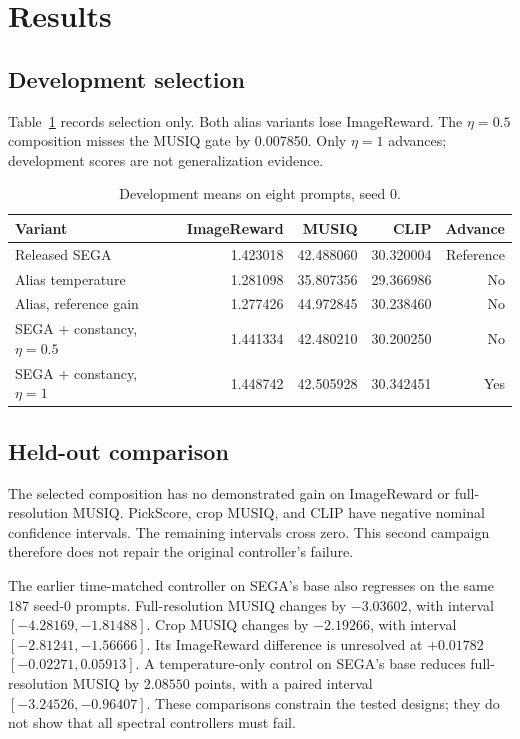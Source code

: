 \section{Results}
\subsection{Development selection}
Table~\ref{tab:dev-current} records selection only. Both alias variants lose
ImageReward. The $\eta=0.5$ composition misses the MUSIQ gate by 0.007850.
Only $\eta=1$ advances; development scores are not generalization evidence.

\begin{table}[ht]
\centering\small
\setlength{\tabcolsep}{4pt}
\caption{Development means on eight prompts, seed 0.}
\label{tab:dev-current}
\begin{tabular}{@{}lrrrr@{}}
\toprule
Variant & ImageReward & MUSIQ & CLIP & Advance\\
\midrule
Released SEGA & 1.423018 & 42.488060 & 30.320004 & Reference\\
Alias temperature & 1.281098 & 35.807356 & 29.366986 & No\\
Alias, reference gain & 1.277426 & 44.972845 & 30.238460 & No\\
SEGA + constancy, $\eta=0.5$ & 1.441334 & 42.480210 & 30.200250 & No\\
SEGA + constancy, $\eta=1$ & 1.448742 & 42.505928 & 30.342451 & Yes\\
\bottomrule
\end{tabular}
\end{table}

\subsection{Held-out comparison}

The selected composition has no demonstrated gain on ImageReward or
full-resolution MUSIQ. PickScore, crop MUSIQ, and CLIP have negative nominal
confidence intervals. The remaining intervals cross zero. This second
campaign therefore does not repair the original controller's failure.

The earlier time-matched controller on SEGA's base also regresses on the same
187 seed-0 prompts. Full-resolution MUSIQ changes by $-3.03602$, with interval
$[-4.28169,-1.81488]$. Crop MUSIQ changes by $-2.19266$, with interval
$[-2.81241,-1.56666]$. Its ImageReward difference is unresolved at
$+0.01782$ $[-0.02271,0.05913]$. A temperature-only control on SEGA's base
reduces full-resolution MUSIQ by $2.08550$ points, with a paired interval
$[-3.24526,-0.96407]$. These comparisons constrain the tested designs;
they do not show that all spectral controllers must fail.

